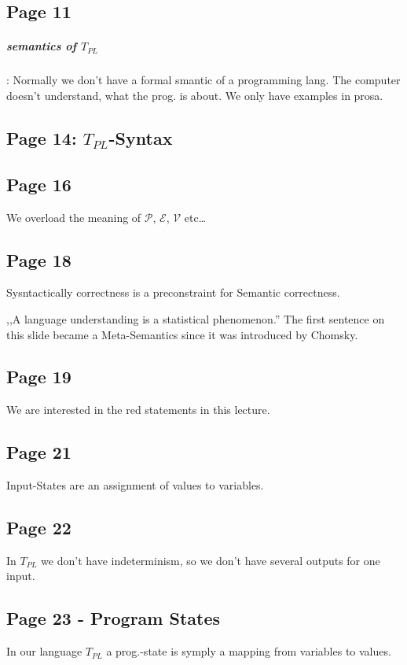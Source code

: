 \documentclass[a4paper]{article}
\newcommand{\TPL}{T_{PL}}
\begin{document}
\subsection{Page 11}
\subparagraph{semantics of $\TPL$}: Normally we don't have a formal smantic of
a programming lang. The computer doesn't understand, what the prog. is about. We
only have examples in prosa.

\subsection{Page 14: $\TPL$-Syntax}

\subsection{Page 16}
We overload the meaning of $\mathcal{P}$, $\mathcal{E}$, $\mathcal{V}$ etc\ldots

\subsection{Page 18}
Sysntactically correctness is a preconstraint for Semantic correctness.

,,A language understanding is a statistical phenomenon.'' The first sentence on
this slide became a Meta-Semantics since it was introduced by Chomsky.

\subsection{Page 19}
We are interested in the red statements in this lecture.

\subsection{Page 21}
Input-States are an assignment of values to variables.

\subsection{Page 22}
In $\TPL$ we don't have indeterminism, so we don't have several outputs for one
input.

\subsection{Page 23 - Program States}
In our language $\TPL$ a prog.-state is symply a mapping from variables to
values.
\end{document}
